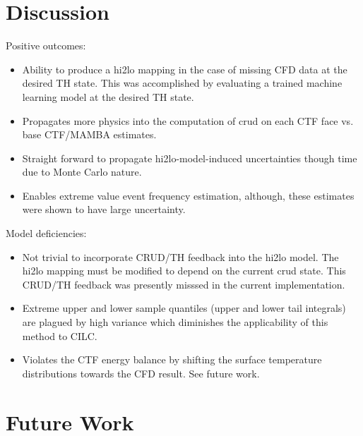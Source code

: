 
\section{Discussion}

Positive outcomes:

\begin{itemize}
	\item  Ability to produce a hi2lo mapping in the case of missing CFD data at the desired TH state.
                This was accomplished by evaluating a trained machine learning model at the desired TH state.
	\item  Propagates more physics into the computation of crud on each CTF face vs. base CTF/MAMBA estimates.
	\item  Straight forward to propagate hi2lo-model-induced uncertainties though time due to Monte Carlo nature.
	\item  Enables extreme value event frequency estimation, although, these estimates were shown to have large uncertainty.
\end{itemize}

\noindent Model deficiencies:

\begin{itemize}
	\item  Not trivial to incorporate CRUD/TH feedback into the hi2lo model.  The hi2lo mapping must be modified to depend on the current crud state.  This CRUD/TH feedback was presently misssed in the current implementation.
	\item  Extreme upper and lower sample quantiles (upper and lower tail integrals) are plagued by high variance which diminishes the applicability of this method to CILC.
        \item Violates the CTF energy balance by shifting the surface temperature distributions towards the CFD result.  See future work.
\end{itemize}

\section{Future Work}

